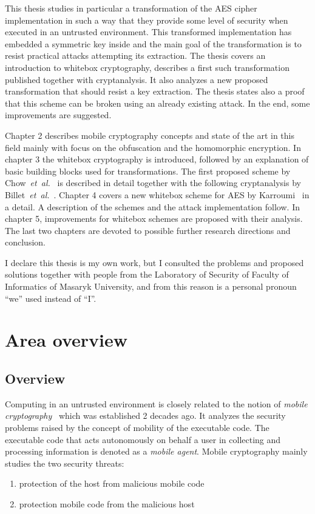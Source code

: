 \documentclass[11pt,oneside,final]{fithesis2}
\newcommand{\eal}{\emph{et~al.}}
\begin{document}
    This thesis studies in particular a transformation of the AES cipher~\citep{2002-daemen} implementation in such a way that they provide some
    level of security when executed in an untrusted environment. This transformed implementation has embedded a symmetric key inside
    and the main goal of the transformation is to resist practical attacks attempting its extraction. The thesis covers an introduction
    to whitebox cryptography, describes a first such transformation published together with cryptanalysis. It also analyzes a new 
    proposed transformation that should resist a key extraction. The thesis states also a proof that this scheme can be broken 
    using an already existing attack. In the end, some improvements are suggested.

    Chapter 2 describes mobile cryptography concepts and state of the art in this field mainly with focus on the obfuscation and the homomorphic encryption.
    In chapter 3 the whitebox cryptography is introduced, followed by an explanation of basic building blocks used for transformations. The first proposed scheme 
    by Chow~\eal~\citep{Chow02white-boxcryptography} is described in detail together with the following cryptanalysis by Billet~\eal~\citep{Billet:2004:CWB:2080787.2080809}.
    Chapter 4 covers a new whitebox scheme for AES by Karroumi~\citep{Karroumi:2010:PWA:2041036.2041060} in a detail. 
    A description of the schemes and the attack implementation follow. 
    In chapter 5, improvements for whitebox schemes are proposed with their analysis. The last two chapters are devoted to possible further 
    research directions and conclusion.

    I declare this thesis is my own work, but I consulted the problems and proposed solutions together with people from the Laboratory of Security of
    Faculty of Informatics of Masaryk University, and from this reason is a personal pronoun ``we'' used instead of ``I''.

\chapter{Area overview}\label{sec:theory}
    
    \section{Overview}
    Computing in an untrusted environment is closely related to the notion of \emph{mobile cryptography}~\citep{mobile_cryptography} which was established 2 decades ago.
    It analyzes the security problems raised by the concept of mobility of the executable code. The executable code that acts autonomously on behalf a user in collecting 
    and processing information is denoted as a \emph{mobile agent}. Mobile cryptography mainly studies the two security threats:
    \begin{enumerate}
     \item protection of the host from malicious mobile code
     \item protection mobile code from the malicious host
    \end{enumerate}
    
\end{document}
